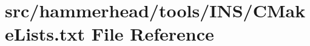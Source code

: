 \hypertarget{tools_2INS_2CMakeLists_8txt}{}\section{src/hammerhead/tools/\+I\+N\+S/\+C\+Make\+Lists.txt File Reference}
\label{tools_2INS_2CMakeLists_8txt}
